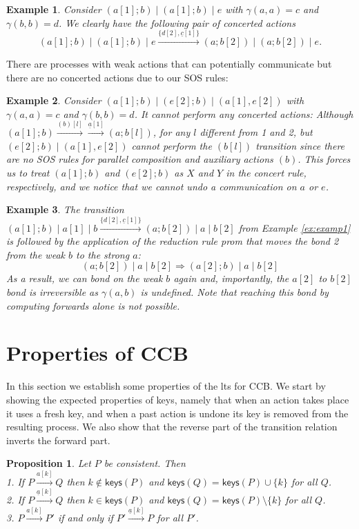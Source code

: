 \documentclass[preprint,12pt]{elsarticle}
\newcommand{\paral}{\; \vert \;}
\newcommand{\keys}[1]{\mathsf{keys}(#1)}
\newtheorem{example}{Example}
\newtheorem{proposition}{Proposition}
\begin{document}
\begin{example}\label{ex:examp2}
Consider $(a[1];b)\paral (a[1];b)\paral e$ with $\gamma(a,a)=c$ and $\gamma(b,b)=d$. 
We clearly have the following pair of concerted actions
 $$(a[1];b)\paral (a[1];b)\paral e  \xrightarrow{\{d[2], \underline{c}[1]\}} 
(a;b[2])\paral (a;b[2])\paral e. $$
\end{example}

There are processes with weak actions that can potentially communicate but there are no concerted actions
due to our SOS rules:

\begin{example}\label{ex:examp3}
Consider $(a[1];b)\paral (e[2];b)\paral (a[1],e[2])$ with $\gamma(a,a)=c$ and $\gamma(b,b)=d$.
It cannot perform any concerted actions: Although $(a[1];b)  \xrightarrow{(b)[l]} 
\xrightarrow{\underline{a}[1]} (a;b[l])$, for any $l$ different from 1 and 2, but 
$(e[2];b)\paral (a[1],e[2])$  cannot perform the $(b[l])$
transition since there are no SOS rules for parallel composition and auxiliary actions $(b)$. This forces us
to treat $(a[1];b)$ and $ (e[2];b)$ as $X$ and $Y$ in the concert rule, respectively, and we notice that
we cannot undo a communication on $a$ or $e$.
\end{example}


\begin{example}\label{example4}
The transition 
$(a[1];b) \paral a[1] \paral  b \xrightarrow{\{d[2], \underline{c}[1]\}} (a;b[2])\paral a \paral b[2]$ 
from Example \ref{ex:examp1} is followed by the application of the reduction rule prom that moves the bond 2
from the weak $b$ to the strong $a$:
$$(a;b[2])\paral a \paral b[2] \Rightarrow (a[2];b)\paral a \paral b[2] $$
As a result, we can bond on the weak $b$ again and, importantly, the $a[2]$ to $b[2]$ bond is irreversible
as $\gamma(a,b)$ is undefined. Note that reaching
this bond by computing forwards alone is not possible.
\end{example}

\section{Properties of CCB} \label{sec:properties}
In this section we establish some properties of the lts for CCB. 
We start by showing the expected properties of keys, namely that when an action takes place it uses a fresh
key, and when a past action is undone its key is removed from the resulting process. We also show that 
the reverse part of the transition relation inverts the forward part.
\begin{proposition}\label{keys1}
Let $P$ be consistent. Then\\
1.  If $P \xrightarrow{a[k]} Q$ then $k \notin \keys{P}$ and $\keys{Q}=\keys{P} \cup \{k\}$ for all $Q$.\\
2. If $P \xrightarrow{\underline{a}[k]} Q$ then $k \in \keys{P}$ and $\keys{Q}=\keys{P} \setminus \{k\}$
for all $Q$.\\
3. $P \xrightarrow{a[k]} P'$ if and only if $P' \xrightarrow{\underline{a}[k]} P$ for all $P'$.
\end{proposition}
\end{document}
